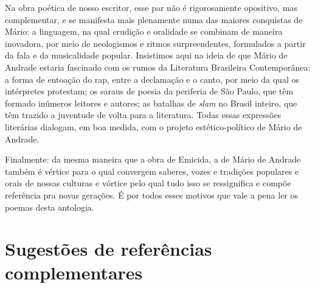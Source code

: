 \documentclass[11pt]{extarticle}
\begin{document}
Na obra poética de nosso escritor, esse par não é rigorosamente
opositivo, mas complementar, e se manifesta mais plenamente numa das
maiores conquistas de Mário: a linguagem, na qual erudição e oralidade
se combinam de maneira inovadora, por meio de neologismos e ritmos
surpreendentes, formulados a partir da fala e da musicalidade popular.
Insistimos aqui na ideia de que Mário de Andrade estaria fascinado com
os rumos da Literatura Brasileira Contemporânea: a forma de entoação do
rap, entre a declamação e o canto, por meio da qual os intérpretes
protestam; os saraus de poesia da periferia de São Paulo, que têm
formado inúmeros leitores e autores; as batalhas de \emph{slam} no
Brasil inteiro, que têm trazido a juventude de volta para a literatura.
Todas essas expressões literárias dialogam, em boa medida, com o projeto
estético-político de Mário de Andrade.

Finalmente: da mesma maneira que a obra de Emicida, a de Mário de
Andrade também é vértice para o qual convergem saberes, vozes e
tradições populares e orais de nossas culturas e vórtice pelo qual tudo
isso se ressignifica e compõe referência pra novas gerações. É por todos
esses motivos que vale a pena ler os poemas desta antologia.

\section{Sugestões de referências complementares}\label{sugestoes}
\end{document}
